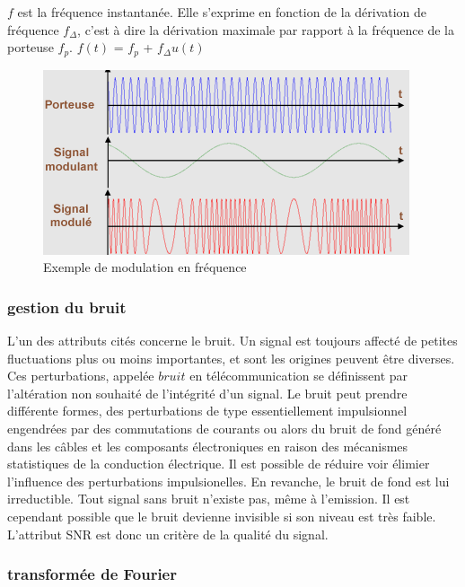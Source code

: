 \documentclass[12pt,a4paper,oneside, titlepage]{report}
\begin{document}
$f$ est la fréquence instantanée. Elle s'exprime en fonction de la dérivation de fréquence $f_{\Delta}$, c'est à dire la dérivation maximale par rapport à la fréquence de la porteuse $f_{p}$. $f(t)$ = $f_{p}$ + $f_{\Delta} u(t)$

\begin{figure}[h]
\centering

\includegraphics[scale=1]{../images/FM_mod.PNG}
\caption{Exemple de modulation en fréquence}\label{term4}
\end{figure}



\subsubsection{gestion du bruit}



L'un des attributs cités concerne le bruit. Un signal est toujours affecté de petites fluctuations plus ou moins importantes, et sont les origines peuvent être diverses. Ces perturbations, appelée $bruit$ en télécommunication se définissent par l'altération non souhaité de l'intégrité d'un signal. Le bruit peut prendre différente formes, des perturbations de type essentiellement impulsionnel engendrées par des commutations de courants ou alors du bruit de fond généré dans les câbles et les composants électroniques en raison
des mécanismes statistiques de la conduction électrique. Il est possible de réduire voir élimier l'influence des perturbations impulsionelles. En revanche, le bruit de fond est lui irreductible. Tout signal sans bruit n'existe pas, même à l'emission. Il est cependant possible que le bruit devienne invisible si son niveau est très faible. L'attribut SNR est donc un critère de la qualité du signal.


\subsubsection{transformée de Fourier}
\end{document}
